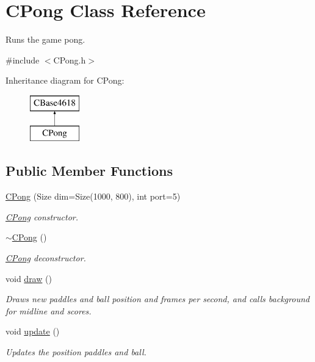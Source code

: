 \hypertarget{class_c_pong}{}\section{C\+Pong Class Reference}
\label{class_c_pong}


Runs the game pong.  




{\ttfamily \#include $<$C\+Pong.\+h$>$}

Inheritance diagram for C\+Pong\+:\begin{figure}[H]
\begin{center}
\leavevmode
\includegraphics[height=2.000000cm]{class_c_pong}
\end{center}
\end{figure}
\subsection*{Public Member Functions}
\begin{DoxyCompactItemize}
\item 
\hyperlink{class_c_pong_ac118507edc4d9cc2dd1d2f1d9e88fa45}{C\+Pong} (Size dim=Size(1000, 800), int port=5)
\begin{DoxyCompactList}\small\item\em \hyperlink{class_c_pong}{C\+Pong} constructor. \end{DoxyCompactList}\item 
\hyperlink{class_c_pong_aff4c3b1dc98694c7fafe100499e686a1}{$\sim$\+C\+Pong} ()
\begin{DoxyCompactList}\small\item\em \hyperlink{class_c_pong}{C\+Pong} deconstructor. \end{DoxyCompactList}\item 
void \hyperlink{class_c_pong_ae5c14ff09d074474ffd4f220b21dc00f}{draw} ()
\begin{DoxyCompactList}\small\item\em Draws new paddles and ball position and frames per second, and calls background for midline and scores. \end{DoxyCompactList}\item 
void \hyperlink{class_c_pong_abdf0d44329b40d14863ba134b031435a}{update} ()
\begin{DoxyCompactList}\small\item\em Updates the position paddles and ball. \end{DoxyCompactList}\end{DoxyCompactItemize}

